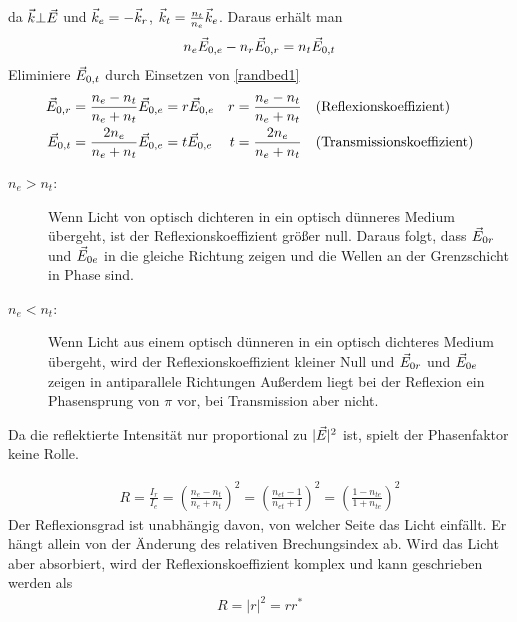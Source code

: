 da $\vec{k}\bot\vec{E}$ und $\vec{k}_e = -\vec{k}_r$, 
$\vec{k}_t = \frac{n_t}{n_e}\vec{k}_e$. Daraus erhält man
\begin{gather*}
  n_e\vec{E}_{0,e} -   n_r\vec{E}_{0,r} =   n_t\vec{E}_{0,t}
\end{gather*}
Eliminiere $\vec{E}_{0,t}$ durch Einsetzen von \eqref{randbed1}
\begin{align*}
  \vec{E}_{0,r} &= \frac{n_e-n_t}{n_e+n_t} \vec{E}_{0,e} = r\vec{E}_{0,e}
  &r &= \frac{n_e-n_t}{n_e+n_t} 
  &&\text{(Reflexionskoeffizient)}\\
  \vec{E}_{0,t} &= \frac{2n_e}{n_e+n_t} \vec{E}_{0,e} = t\vec{E}_{0,e}
  &t &= \frac{2n_e}{n_e+n_t} 
  &&\text{(Transmissionskoeffizient)}
\end{align*}%
%
%
%
%


\begin{description}
\item[$n_e>n_t$:] Wenn Licht von optisch dichteren in ein optisch dünneres
  Medium übergeht, ist der Reflexionskoeffizient größer null. 
  Daraus folgt, dass $\vec{E}_{0r}$ und $\vec{E}_{0e}$ in die gleiche
  Richtung zeigen und die Wellen an der Grenzschicht in Phase sind. 
\item[$n_e<n_t$:] Wenn Licht aus einem optisch dünneren in ein optisch dichteres
  Medium übergeht, wird der Reflexionskoeffizient kleiner Null und
  $\vec{E}_{0r}$ und $\vec{E}_{0e}$ zeigen in antiparallele Richtungen
  Außerdem liegt bei der Reflexion ein Phasensprung von $\pi$ vor,
  bei Transmission aber nicht.
\end{description}
Da die reflektierte Intensität nur proportional zu
$|\vec{E}|^2$ ist, spielt der Phasenfaktor keine Rolle.

\begin{gather*}
  R = \frac{I_r}{I_e}
  =\left( \frac{n_e-n_t}{n_e+n_t} \right)^2
  =\left( \frac{n_{et}-1}{n_{et}+1} \right)^2
  =\left( \frac{1-n_{te}}{1+n_{te}} \right)^2
\end{gather*}
Der Reflexionsgrad ist unabhängig davon, von welcher Seite das Licht
einfällt. Er hängt allein von der Änderung des relativen
Brechungsindex ab. Wird das Licht aber absorbiert, wird der
Reflexionskoeffizient komplex und kann geschrieben werden als
\begin{align*}
  R=\vert r\vert^2=rr^*
\end{align*}

